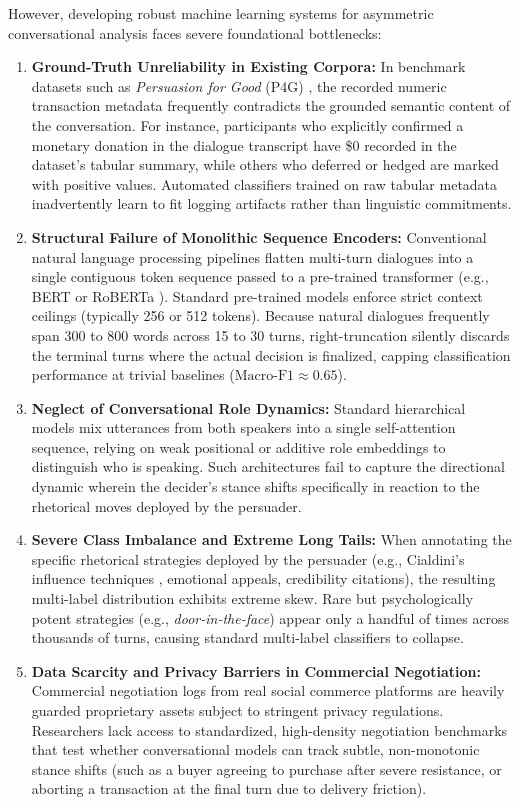 However, developing robust machine learning systems for asymmetric conversational analysis faces severe foundational bottlenecks:
\begin{enumerate}[label=(\alph*)]
  \item \textbf{Ground-Truth Unreliability in Existing Corpora:} In benchmark datasets such as \textit{Persuasion for Good} (P4G) \cite{wang2019persuasion}, the recorded numeric transaction metadata frequently contradicts the grounded semantic content of the conversation. For instance, participants who explicitly confirmed a monetary donation in the dialogue transcript have \$0 recorded in the dataset's tabular summary, while others who deferred or hedged are marked with positive values. Automated classifiers trained on raw tabular metadata inadvertently learn to fit logging artifacts rather than linguistic commitments.
  \item \textbf{Structural Failure of Monolithic Sequence Encoders:} Conventional natural language processing pipelines flatten multi-turn dialogues into a single contiguous token sequence passed to a pre-trained transformer (e.g., BERT \cite{devlin2019bert} or RoBERTa \cite{liu2019roberta}). Standard pre-trained models enforce strict context ceilings (typically 256 or 512 tokens). Because natural dialogues frequently span 300 to 800 words across 15 to 30 turns, right-truncation silently discards the terminal turns where the actual decision is finalized, capping classification performance at trivial baselines ($\text{Macro-F1} \approx 0.65$).
  \item \textbf{Neglect of Conversational Role Dynamics:} Standard hierarchical models mix utterances from both speakers into a single self-attention sequence, relying on weak positional or additive role embeddings to distinguish who is speaking. Such architectures fail to capture the directional dynamic wherein the decider's stance shifts specifically in reaction to the rhetorical moves deployed by the persuader.
  \item \textbf{Severe Class Imbalance and Extreme Long Tails:} When annotating the specific rhetorical strategies deployed by the persuader (e.g., Cialdini's influence techniques \cite{cialdini2001influence}, emotional appeals, credibility citations), the resulting multi-label distribution exhibits extreme skew. Rare but psychologically potent strategies (e.g., \textit{door-in-the-face}) appear only a handful of times across thousands of turns, causing standard multi-label classifiers to collapse.
  \item \textbf{Data Scarcity and Privacy Barriers in Commercial Negotiation:} Commercial negotiation logs from real social commerce platforms are heavily guarded proprietary assets subject to stringent privacy regulations. Researchers lack access to standardized, high-density negotiation benchmarks that test whether conversational models can track subtle, non-monotonic stance shifts (such as a buyer agreeing to purchase after severe resistance, or aborting a transaction at the final turn due to delivery friction).
\end{enumerate}

